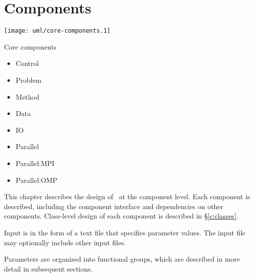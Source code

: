 \chapter{Components} \label{c:components}

\centerline{\texttt{[image: uml/core-components.1]}}

Core components

\begin{itemize}
\item Control
\item Problem
\item Method
\item Data
\item IO
\end{itemize}

\begin{itemize}
\item Parallel
\item Parallel:MPI
\item Parallel:OMP
\end{itemize}


   This chapter describes the design of \cello\ at the component
   level.  Each component is described, including the component interface and dependencies on other components.  Class-level design of each component is described in \S\ref{c:classes}.


Input is in the form of a text file that specifies
   parameter values.  The input file may optionally include other
   input files.

   Parameters are organized into functional groups, which are described
   in more detail in subsequent sections.

